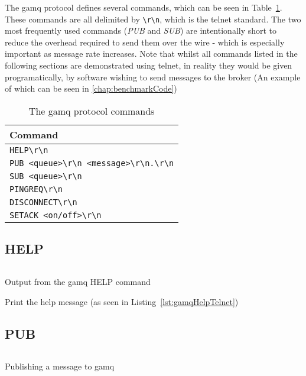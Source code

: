 The gamq protocol defines several commands, which can be seen in
Table~\ref{tab:protocol}. These commands are all delimited by \verb|\r\n|, which
is the telnet standard. The two most frequently used commands (\emph{PUB} and
\emph{SUB}) are intentionally short to reduce the overhead required to send them
over the wire - which is especially important as message rate increases. Note
that whilst all commands listed in the following sections are demonstrated using
telnet, in reality they would be given programatically, by software wishing to
send messages to the broker (An example of which can be seen in
\ref{chap:benchmarkCode})

\begin{table}[H]
\centering
\caption{The gamq protocol commands}
\label{tab:protocol}
\begin{tabular}{|l|}
\hline
Command \\ \hline
\verb|HELP\r\n|                           \\
\verb|PUB <queue>\r\n <message>\r\n.\r\n| \\
\verb|SUB <queue>\r\n|                    \\
\verb|PINGREQ\r\n|                        \\
\verb|DISCONNECT\r\n|                     \\
\verb|SETACK <on/off>\r\n|                \\ \hline
\end{tabular}
\end{table}

\subsection{HELP}
\label{sub:helpCommand}

\begin{listing}[H]
  \centering
  \inputminted{bash}{code/gamqHelpOutputTelnet}
  \caption{Output from the gamq HELP command}
  \label{lst:gamqHelpTelnet}
\end{listing}

Print the help message (as seen in Listing~\ref{lst:gamqHelpTelnet})

\subsection{PUB}
\label{sub:pubCommand}

\begin{listing}[H]
  \centering
  \inputminted{bash}{code/gamqPubOutput}
  \caption{Publishing a message to gamq}
  \label{lst:gamqPubTelnet}
\end{listing}

